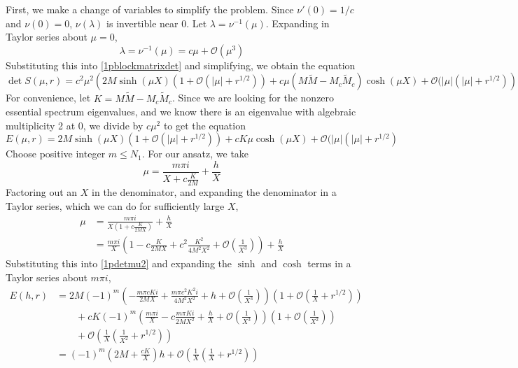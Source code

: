 \documentclass[thesis.tex]{subfiles}
\begin{document}
First, we make a change of variables to simplify the problem. Since $\nu'(0) = 1/c$ and $\nu(0) = 0$, $\nu(\lambda)$ is invertible near 0. Let $\lambda = \nu^{-1}(\mu)$. Expanding in Taylor series about $\mu = 0$,
\begin{equation}\label{2plambdamu}
\lambda = \nu^{-1}(\mu) = c \mu + \mathcal{O}(\mu^3)
\end{equation}
Substituting this into \cref{1pblockmatrixdet} and simplifying, we obtain the equation
\begin{equation}\label{1pdetmu}
\det S(\mu, r) = c^2 \mu^2 \left( 2 M \sinh(\mu X)(1 + \mathcal{O}(|\mu| + r^{1/2})) + c \mu (M \tilde{M} - M_c \tilde{M}_c)\cosh(\mu X) + \mathcal{O}(|\mu|(|\mu| + r^{1/2}) \right)
\end{equation}
For convenience, let $K = M \tilde{M} - M_c \tilde{M}_c$. Since we are looking for the nonzero essential spectrum eigenvalues, and we know there is an eigenvalue with algebraic multiplicity 2 at 0, we divide by $c \mu^2$ to get the equation
\begin{equation}\label{1pdetmu2}
E(\mu, r) = 2 M \sinh(\mu X)(1 + \mathcal{O}(|\mu| + r^{1/2})) + c K \mu \cosh(\mu X) + \mathcal{O}(|\mu|(|\mu| + r^{1/2})
\end{equation}
Choose positive integer $m \leq N_1$. For our ansatz, we take
\begin{equation}\label{singlemu}
\mu = \frac{m \pi i}{X + c \frac{K}{2 M}} + \frac{h}{X}
\end{equation}
Factoring out an $X$ in the denominator, and expanding the denominator in a Taylor series, which we can do for sufficiently large $X$,
\begin{align*}
\mu &= \frac{m \pi i}{X\left(1  + c \frac{K}{2 M X} \right) } + \frac{h}{X} \\
&= \frac{m \pi i}{X}\left( 1 - c \frac{K}{2 M X} + c^2 \frac{K^2}{4 M^2 X^2} + \mathcal{O}\left(\frac{1}{X^3}\right) \right) + \frac{h}{X}
\end{align*}
Substituting this into \cref{1pdetmu2} and expanding the $\sinh$ and $\cosh$ terms in a Taylor series about $m \pi i$,
\begin{align*}
E(h, r) &= 2 M (-1)^m \left( -\frac{m \pi c K i}{2 M X} + \frac{m \pi c^2 K^2 i}{4 M^2 X^2} + h + \mathcal{O}\left(\frac{1}{X^3}\right) \right) \left(1 + \mathcal{O}\left( \frac{1}{X} + r^{1/2} \right) \right) \\
&\qquad+ c K (-1)^m \left( \frac{m \pi i}{X} - c \frac{m \pi K i}{2 M X^2} + \frac{h}{X} + \mathcal{O}\left(\frac{1}{X^3}\right) \right) \left( 1 + \mathcal{O}\left(\frac{1}{X^2}\right) \right) \\
&\qquad+ \mathcal{O}\left( \frac{1}{X} \left( \frac{1}{X^2} + r^{1/2} \right) \right) \\
&= (-1)^m\left( 2M + \frac{cK}{X} \right) h + \mathcal{O}\left( \frac{1}{X} \left( \frac{1}{X} + r^{1/2} \right) \right)
\end{align*}
\end{document}
